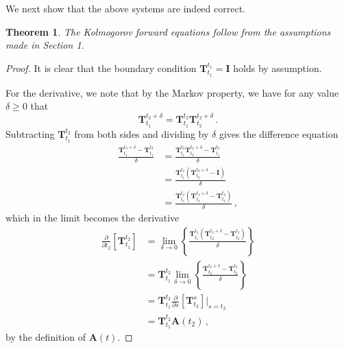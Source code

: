 \documentclass[10pt]{article}
\newtheorem{theorem}{Theorem}[section]
\newtheorem{proposition}[theorem]{Proposition}
\begin{document}
We next show that the above systems are indeed correct.
\newpage
\begin{theorem}
The Kolmogorov forward equations follow from the assumptions made in Section 1.
\end{theorem}
\begin{proof}
It is clear that the boundary condition $\mathbf{T}_{t_1}^{t_1}=\mathbf{I}$ holds by assumption.

For the derivative, we note that by the Markov property, we have for any value $\delta\geq 0$ that
\begin{equation*}
\mathbf{T}_{t_1}^{t_2+\delta} = \mathbf{T}_{t_1}^{t_2}\mathbf{T}_{t_2}^{t_2+\delta}\,.
\end{equation*}
Subtracting $\mathbf{T}_{t_1}^{t_2}$ from both sides and dividing by $\delta$ gives the difference equation
\begin{align*}
\frac{\mathbf{T}_{t_1}^{t_2+\delta} - \mathbf{T}_{t_1}^{t_2}}{\delta} &= \frac{\mathbf{T}_{t_1}^{t_2}\mathbf{T}_{t_2}^{t_2+\delta} - \mathbf{T}_{t_1}^{t_2}}{\delta} \\
 &= \frac{\mathbf{T}_{t_1}^{t_2}\left(\mathbf{T}_{t_2}^{t_2+\delta} - \mathbf{I}\right)}{\delta} \\ 
 &= \frac{\mathbf{T}_{t_1}^{t_2}\left(\mathbf{T}_{t_2}^{t_2+\delta} - \mathbf{T}_{t_2}^{t_2}\right)}{\delta}\,,
\end{align*}
which in the limit becomes the derivative
\begin{align*}
\frac{\partial}{\partial t_2}\left[\mathbf{T}_{t_1}^{t_2}\right] &= \lim_{\delta\rightarrow 0}\left\{\frac{\mathbf{T}_{t_1}^{t_2}\left(\mathbf{T}_{t_2}^{t_2+\delta} - \mathbf{T}_{t_2}^{t_2}\right)}{\delta}\right\} \\
&= \mathbf{T}_{t_1}^{t_2}\lim_{\delta\rightarrow 0}\left\{\frac{\mathbf{T}_{t_2}^{t_2+\delta} - \mathbf{T}_{t_2}^{t_2}}{\delta}\right\} \\
&= \mathbf{T}_{t_1}^{t_2}\frac{\partial}{\partial s}\left[\mathbf{T}_{t_2}^s\right]\Big\vert_{s=t_2} \\
&= \mathbf{T}_{t_1}^{t_2}\mathbf{A}(t_2)\,,
\end{align*}
by the definition of $\mathbf{A}(t)$.
\end{proof}
\end{document}
